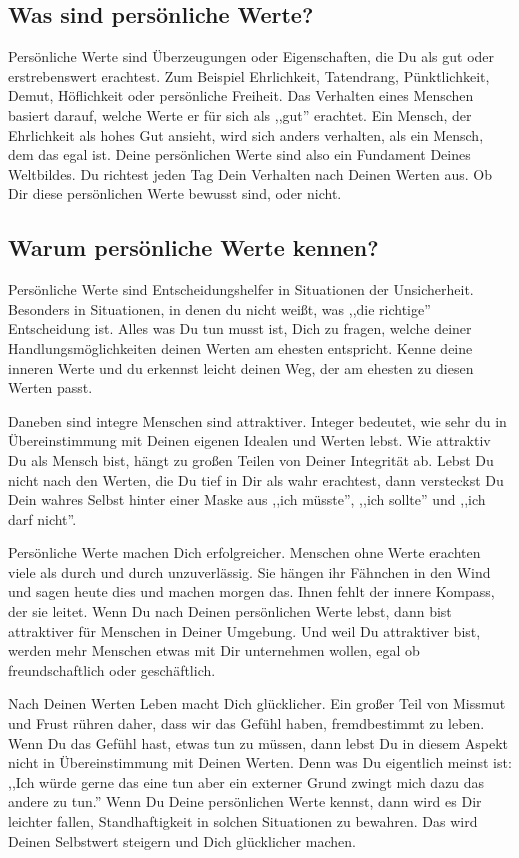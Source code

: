 \documentclass[../Lebensziel.tex]{subfiles}
\begin{document}
\subsection{Was sind persönliche Werte?}
Persönliche Werte sind Überzeugungen oder Eigenschaften, die Du als gut oder erstrebenswert erachtest. Zum Beispiel Ehrlichkeit, Tatendrang, Pünktlichkeit, Demut, Höflichkeit oder persönliche Freiheit. Das Verhalten eines Menschen basiert darauf, welche Werte er für sich als ,,gut'' erachtet. Ein Mensch, der Ehrlichkeit als hohes Gut ansieht, wird sich anders verhalten, als ein Mensch, dem das egal ist.
Deine persönlichen Werte sind also ein Fundament Deines Weltbildes. Du richtest jeden Tag Dein Verhalten nach Deinen Werten aus. Ob Dir diese persönlichen Werte bewusst sind, oder nicht.

\subsection{Warum persönliche Werte kennen?}
Persönliche Werte sind Entscheidungshelfer in Situationen der Unsicherheit. Besonders in Situationen, in denen du nicht weißt, was ,,die richtige'' Entscheidung ist. Alles was Du tun musst ist, Dich zu fragen, welche deiner Handlungsmöglichkeiten deinen Werten am ehesten entspricht. Kenne deine inneren Werte und du erkennst leicht deinen Weg, der am ehesten zu diesen Werten passt.

Daneben sind integre Menschen sind attraktiver. Integer bedeutet, wie sehr du in Übereinstimmung mit Deinen eigenen Idealen und Werten lebst. Wie attraktiv Du als Mensch bist, hängt zu großen Teilen von Deiner Integrität ab. Lebst Du nicht nach den Werten, die Du tief in Dir als wahr erachtest, dann versteckst Du Dein wahres Selbst hinter einer Maske aus ,,ich müsste'', ,,ich sollte'' und ,,ich darf nicht''.

Persönliche Werte machen Dich erfolgreicher. Menschen ohne Werte erachten viele als durch und durch unzuverlässig. Sie hängen ihr Fähnchen in den Wind und sagen heute dies und machen morgen das. Ihnen fehlt der innere Kompass, der sie leitet. Wenn Du nach Deinen persönlichen Werte lebst, dann bist attraktiver für Menschen in Deiner Umgebung. Und weil Du attraktiver bist, werden mehr Menschen etwas mit Dir unternehmen wollen, egal ob freundschaftlich oder geschäftlich.

Nach Deinen Werten Leben macht Dich glücklicher. Ein großer Teil von Missmut und Frust rühren daher, dass wir das Gefühl haben, fremdbestimmt zu leben. Wenn Du das Gefühl hast, etwas tun zu müssen, dann lebst Du in diesem Aspekt nicht in Übereinstimmung mit Deinen Werten. Denn was Du eigentlich meinst ist: ,,Ich würde gerne das eine tun aber ein externer Grund zwingt mich dazu das andere zu tun.''
Wenn Du Deine persönlichen Werte kennst, dann wird es Dir leichter fallen, Standhaftigkeit in solchen Situationen zu bewahren. Das wird Deinen Selbstwert steigern und Dich glücklicher machen.
\end{document}
